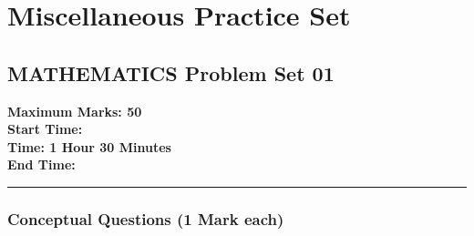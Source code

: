 \documentclass[12pt,a4paper,twoside]{book}
\begin{document}
\part{Miscellaneous Practice Set}

\chapter{MATHEMATICS Problem Set 01}

	\begin{center}
	\vspace{-20pt}
		\begin{multicols}{2}
		\textbf {Maximum Marks: 50}\\
\textbf{Start Time:}\\
\textbf{Time: 1 Hour 30 Minutes}\\
\textbf{End Time:}\\
		\end{multicols}
		\rule{\textwidth}{1pt}
	\end{center}
	\section*{Conceptual Questions (1 Mark each)}
	
\end{document}
